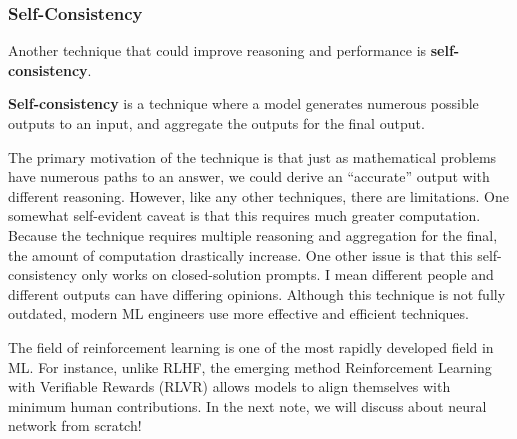 \documentclass[../../main.tex]{subfiles}
\begin{document}
\subsubsection{Self-Consistency}

Another technique that could improve reasoning and performance
is \textbf{self-consistency}.

\begin{definition}{}{}
\textbf{Self-consistency} is a technique where a model generates
numerous possible outputs to an input, and aggregate the outputs
for the final output.
\end{definition}

The primary motivation of the technique is that just as mathematical
problems have numerous paths to an answer, we could derive an
``accurate'' output with different reasoning. However, like any
other techniques, there are limitations. One somewhat self-evident
caveat is that this requires much greater computation. Because the
technique requires multiple reasoning and aggregation for the final,
the amount of computation drastically increase. One other issue is
that this self-consistency only works on closed-solution prompts.
I mean different people and different outputs can have differing
opinions. Although this technique is not fully outdated, modern ML
engineers use more effective and efficient techniques.

The field of reinforcement learning is one of the most rapidly
developed field in ML. For instance, unlike RLHF, the emerging
method Reinforcement Learning with Verifiable Rewards (RLVR)
allows models to align themselves with minimum human contributions.
In the next note, we will discuss about neural network from scratch!
\end{document}
